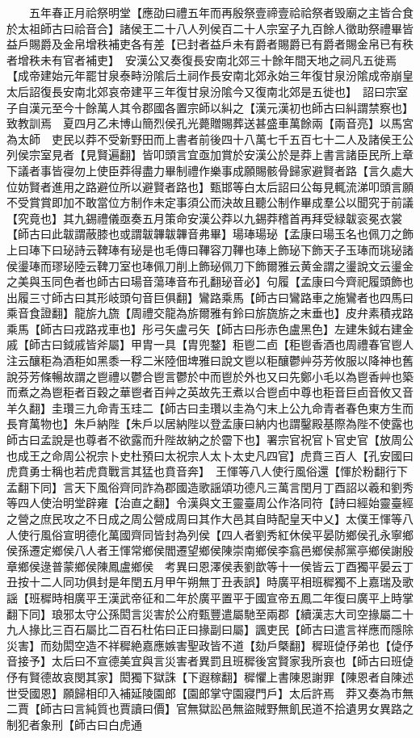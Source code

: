 　　五年春正月祫祭明堂【應劭曰禮五年而再殷祭壹禘壹祫祫祭者毁廟之主皆合食於太祖師古曰祫音合】諸侯王二十八人列侯百二十人宗室子九百餘人徵助祭禮畢皆益戶賜爵及金帛增秩補吏各有差【已封者益戶未有爵者賜爵已有爵者賜金帛已有秩者增秩未有官者補吏】　安漢公又奏復長安南北郊三十餘年間天地之祠凡五徙焉【成帝建始元年罷甘泉泰畤汾隂后土祠作長安南北郊永始三年復甘泉汾隂成帝崩皇太后詔復長安南北郊哀帝建平三年復甘泉汾隂今又復南北郊是五徙也】　詔曰宗室子自漢元至今十餘萬人其令郡國各置宗師以糾之【漢元漢初也師古曰糾謂禁察也】致教訓焉　夏四月乙未博山簡烈侯孔光薨贈賜葬送甚盛車萬餘兩【兩音亮】以馬宮為太師　吏民以莽不受新野田而上書者前後四十八萬七千五百七十二人及諸侯王公列侯宗室見者【見賢遍翻】皆叩頭言宜亟加賞於安漢公於是莽上書言諸臣民所上章下議者事皆寑勿上使臣莽得盡力畢制禮作樂事成願賜骸骨歸家避賢者路【言久處大位妨賢者進用之路避位所以避賢者路也】甄邯等白太后詔曰公每見輒流涕叩頭言願不受賞賞即加不敢當位方制作未定事須公而決故且聽公制作畢成羣公以聞究于前議【究竟也】其九錫禮儀亟奏五月策命安漢公莽以九錫莽稽首再拜受緑韍衮冕衣裳【師古曰此韍謂蔽膝也或謂韍韠韍韠音弗畢】瑒琫瑒珌【孟康曰瑒玉名也佩刀之飾上曰琫下曰珌詩云鞞琫有珌是也毛傳曰鞸容刀鞸也琫上飾珌下飾天子玉琫而珧珌諸侯璗琫而璆珌陸云鞞刀室也琫佩刀削上飾珌佩刀下飾爾雅云黄金謂之璗說文云璗金之美與玉同色者也師古曰瑒音蕩琫音布孔翻珌音必】句履【孟康曰今齊祀履頭飾也出履三寸師古曰其形岐頭句音巨俱翻】鸞路乘馬【師古曰鸞路車之施鸞者也四馬曰乘音食證翻】龍旂九旒【周禮交龍為旂爾雅有鈴曰旂旒旂之末垂也】皮弁素積戎路乘馬【師古曰戎路戎車也】彤弓矢盧弓矢【師古曰彤赤色盧黑色】左建朱鉞右建金戚【師古曰鉞戚皆斧屬】甲胄一具【胄兜鍪】秬鬯二卣【秬鬯香酒也周禮春官鬯人注云釀秬為酒秬如黑黍一稃二米陸佃埤雅曰說文鬯以秬釀鬱艸芬芳攸服以降神也舊說芬芳條暢故謂之鬯禮以鬱合鬯言鬱於中而鬯於外也又曰先鄭小毛以為鬯香艸也築而煮之為鬯秬者百穀之華鬯者百艸之英故先王煮以合鬯卣中尊也秬音巨卣音攸又音羊久翻】圭瓚三九命青玉珪二【師古曰圭瓚以圭為勺末上公九命青者春色東方生而長育萬物也】朱戶納陛【朱戶以居納陛以登孟康曰納内也謂鑿殿基際為陛不使露也師古曰孟說是也尊者不欲露而升陛故納之於霤下也】署宗官祝官卜官史官【放周公也成王之命周公祝宗卜史杜預曰太祝宗人太卜太史凡四官】虎賁三百人【孔安國曰虎賁勇士稱也若虎賁戰言其猛也賁音奔】　王惲等八人使行風俗還【惲於粉翻行下孟翻下同】言天下風俗齊同詐為郡國造歌謡頌功德凡三萬言閏月丁酉詔以羲和劉秀等四人使治明堂辟雍【治直之翻】令漢與文王靈臺周公作洛同符【詩曰經始靈臺經之營之庶民攻之不日成之周公營成周曰其作大邑其自時配皇天中乂】太僕王惲等八人使行風俗宣明德化萬國齊同皆封為列侯【四人者劉秀紅休侯平晏防鄉侯孔永寧鄉侯孫遷定鄉侯八人者王惲常鄉侯閻遷望鄉侯陳崇南鄉侯李翕邑鄉侯郝黨亭鄉侯謝殷章鄉侯逯普蒙鄉侯陳鳳盧鄉侯　考異曰恩澤侯表劉歆等十一侯皆云丁酉獨平晏云丁丑按十二人同功俱封是年閏五月甲午朔無丁丑表誤】時廣平相班穉獨不上嘉瑞及歌謡【班穉時相廣平王漢武帝征和二年於廣平置平于國宣帝五鳳二年復曰廣平上時掌翻下同】琅邪太守公孫閎言災害於公府甄豐遣屬馳至兩郡【續漢志大司空掾屬二十九人掾比三百石屬比二百石杜佑曰正曰掾副曰屬】諷吏民【師古曰遣言祥應而隱除災害】而劾閎空造不祥穉絶嘉應嫉害聖政皆不道【劾戶槩翻】穉班偼伃弟也【偼伃音接予】太后曰不宣德美宜與言災害者異罰且班穉後宮賢家我所哀也【師古曰班偼伃有賢德故哀閔其家】閎獨下獄誅【下遐稼翻】穉懼上書陳恩謝罪【陳恩者自陳述世受國恩】願歸相印入補延陵園郎【園郎掌守園寢門戶】太后許焉　莽又奏為市無二賈【師古曰言純質也賈讀曰價】官無獄訟邑無盜賊野無飢民道不拾遺男女異路之制犯者象刑【師古曰白虎通